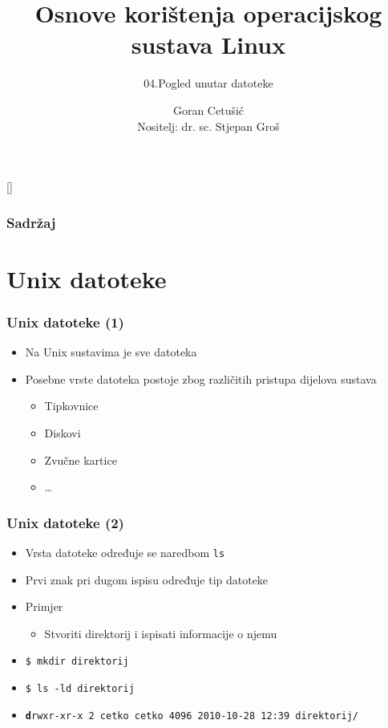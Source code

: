 \documentclass{beamer}
\title{Osnove korištenja operacijskog sustava Linux}
\subtitle{04.Pogled unutar datoteke}
\author[Goran Cetušić]{Goran Cetušić\\{\small Nositelj: dr. sc. Stjepan Groš}}
\institute[FER]{Sveučilište u Zagrebu \\
				Fakultet elektrotehnike i računarstva}
\date{\todayiso}
\newcommand{\shell}[1]{\texttt{#1}}
\begin{document}
{
[] %

\begin{frame}
\maketitle
\end{frame}
}

\begin{frame}
\frametitle{Sadržaj}
\tableofcontents
\end{frame}

\section{Unix datoteke}
\begin{frame}[t]
\frametitle{Unix datoteke (1)}
\begin{itemize}
  \item Na Unix sustavima je sve datoteka
  \item Posebne vrste datoteka postoje zbog različitih pristupa dijelova
        sustava
  \begin{itemize}
    \item Tipkovnice
    \item Diskovi
    \item Zvučne kartice
    \item \ldots
  \end{itemize}
\end{itemize}
\end{frame} 

\begin{frame}[t]
\frametitle{Unix datoteke (2)}
\begin{itemize}
  \item Vrsta datoteke određuje se naredbom \shell{ls}
  \item Prvi znak pri dugom ispisu određuje tip datoteke
  \item Primjer
  \begin{itemize}
    \item Stvoriti direktorij i ispisati informacije o njemu
  \end{itemize}
  \item[] \shell{\$ mkdir direktorij}
  \item[] \shell{\$ ls -ld direktorij}
  \item[] \shell{\footnotesize\textbf{d}rwxr-xr-x 2 cetko cetko 4096 
                          2010-10-28 12:39 direktorij/}
\end{itemize}
\end{frame}
\end{document}
